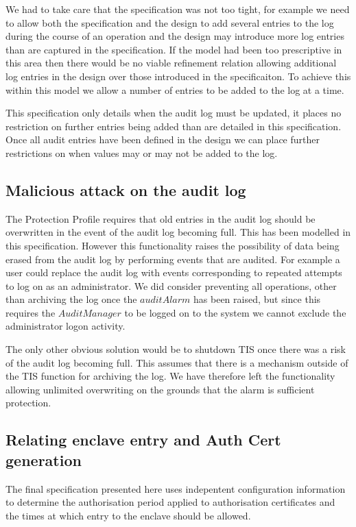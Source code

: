 We had to take care that the specification was not too tight, for
example we need to allow both the specification and the design to add 
several entries to the log during the course of an operation and the
design may introduce more log entries than are captured in the
specification. If the model had been too prescriptive in this area
then 
there would be no viable refinement relation allowing additional 
log entries in the design over those introduced in the specificaiton.
To achieve this within this model we allow a number of entries to be
added to the log at a time. 

This specification only details when the audit log
must be updated, it places no restriction on further entries being
added than are detailed in this specification. Once all audit entries
have been defined in the design we can place further restrictions on
when values may or may not be added to the log.

\subsection{Malicious attack on the audit log}
The Protection Profile \cite{PP} requires that old entries in the
audit log should be overwritten in the event of the audit log becoming
full. This has been modelled in this specification. However this
functionality raises
the possibility of data being erased from the audit log by performing
events that are audited. For example a user could replace the audit
log with events corresponding to repeated attempts to log on as an
administrator. We did consider preventing all operations, other than
archiving the log once the $auditAlarm$ has been raised, but since
this requires the $AuditManager$ to be logged on to the system we
cannot exclude the administrator logon activity. 

The only other obvious solution would be to shutdown TIS once there
was a risk of the audit log becoming full. This assumes that there is
a mechanism outside of the TIS function for archiving the log. 
We have therefore left the functionality allowing unlimited
overwriting on the grounds that the alarm is sufficient protection.

\subsection{Relating enclave entry and Auth Cert generation}

The final specification presented here uses indepentent configuration
information to determine the authorisation period applied to
authorisation certificates and the times at which entry to the enclave
should be allowed. 

